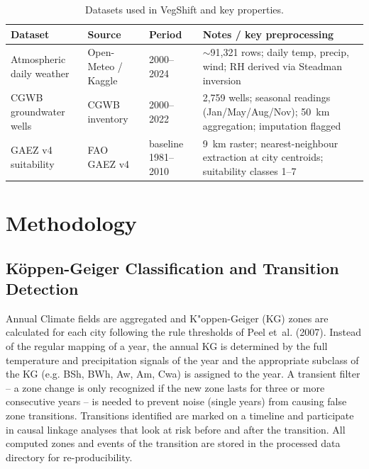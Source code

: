 \documentclass{ieeeaccess}
\begin{document}
\begin{table}[htbp]
\caption{Datasets used in VegShift and key properties.}
\label{tab:datasets}
\centering
\begin{tabular}{l l l p{8cm}}
\hline
Dataset & Source & Period & Notes / key preprocessing \\
\hline
Atmospheric daily weather & Open-Meteo / Kaggle & 2000--2024 & $\sim$91,321 rows; daily temp, precip, wind; RH derived via Steadman inversion \\
CGWB groundwater wells    & CGWB inventory      & 2000--2022 & 2,759 wells; seasonal readings (Jan/May/Aug/Nov); 50~km aggregation; imputation flagged \\
GAEZ v4 suitability       & FAO GAEZ v4         & baseline 1981--2010 & 9~km raster; nearest-neighbour extraction at city centroids; suitability classes 1--7 \\
\hline
\end{tabular}
\end{table}

\section{Methodology}
\label{sec:methodology}

\subsection{Köppen-Geiger Classification and Transition Detection}
Annual Climate fields are aggregated and K"{o}ppen-Geiger (KG) zones are calculated for each city following the rule thresholds of Peel et~al. (2007). Instead of the regular mapping of a year, the annual KG is determined by the full temperature and precipitation signals of the year and the appropriate subclass of the KG (e.g. BSh, BWh, Aw, Am, Cwa) is assigned to the year. A transient filter – a zone change is only recognized if the new zone lasts for three or more consecutive years – is needed to prevent noise (single years) from causing false zone transitions. Transitions identified are marked on a timeline and participate in causal linkage analyses that look at risk before and after the transition. All computed zones and events of the transition are stored in the processed data directory for re-producibility.
\end{document}
